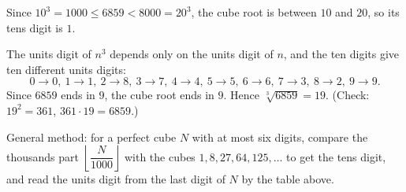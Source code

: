 Since $10^3=1000\le6859<8000=20^3$, the cube root is between $10$ and $20$, so its tens digit is $1$.

The units digit of $n^3$ depends only on the units digit of $n$, and the ten digits give ten different units digits:
\[
0\to0,\ 1\to1,\ 2\to8,\ 3\to7,\ 4\to4,\ 5\to5,\ 6\to6,\ 7\to3,\ 8\to2,\ 9\to9 .
\]
Since $6859$ ends in $9$, the cube root ends in $9$. Hence $\sqrt[3]{6859}=\boxed{19}$. (Check: $19^2=361$, $361\cdot19=6859$.)

General method: for a perfect cube $N$ with at most six digits, compare the thousands part $\left\lfloor\dfrac{N}{1000}\right\rfloor$ with the cubes $1,8,27,64,125,\dots$ to get the tens digit, and read the units digit from the last digit of $N$ by the table above.
